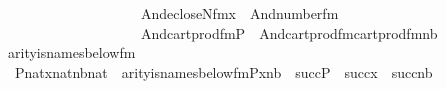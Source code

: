 \begin{isabellebody}
\ \ \ \ \ \ \ \ \ \ \ \ \ \ \ \ \ \ \ \ And{\isacharparenleft}{\kern0pt}ecloseN{\isacharunderscore}{\kern0pt}fm{\isacharparenleft}{\kern0pt}{}{\isacharcomma}{\kern0pt}x\ {\isacharhash}{\kern0pt}{\isacharplus}{\kern0pt}\ {}{\isacharparenright}{\kern0pt}{\isacharcomma}{\kern0pt}And{\isacharparenleft}{\kern0pt}number{}{\isacharunderscore}{\kern0pt}fm{\isacharparenleft}{\kern0pt}{}{\isacharparenright}{\kern0pt}{\isacharcomma}{\kern0pt}\isanewline
\ \ \ \ \ \ \ \ \ \ \ \ \ \ \ \ \ \ \ \ And{\isacharparenleft}{\kern0pt}cartprod{\isacharunderscore}{\kern0pt}fm{\isacharparenleft}{\kern0pt}{}{\isacharcomma}{\kern0pt}P\ {\isacharhash}{\kern0pt}{\isacharplus}{\kern0pt}\ {}{\isacharcomma}{\kern0pt}{}{\isacharparenright}{\kern0pt}{\isacharcomma}{\kern0pt}And{\isacharparenleft}{\kern0pt}cartprod{\isacharunderscore}{\kern0pt}fm{\isacharparenleft}{\kern0pt}{}{\isacharcomma}{\kern0pt}{}{\isacharcomma}{\kern0pt}{}{\isacharparenright}{\kern0pt}{\isacharcomma}{\kern0pt}cartprod{\isacharunderscore}{\kern0pt}fm{\isacharparenleft}{\kern0pt}{}{\isacharcomma}{\kern0pt}{}{\isacharcomma}{\kern0pt}nb{\isacharhash}{\kern0pt}{\isacharplus}{\kern0pt}{}{\isacharparenright}{\kern0pt}{\isacharparenright}{\kern0pt}{\isacharparenright}{\kern0pt}{\isacharparenright}{\kern0pt}{\isacharparenright}{\kern0pt}{\isacharparenright}{\kern0pt}{\isacharparenright}{\kern0pt}{\isacharparenright}{\kern0pt}{\isacharparenright}{\kern0pt}{\isachardoublequoteclose}\isanewline
\isanewline
{}\isamarkupfalse%
\ arity{\isacharunderscore}{\kern0pt}is{\isacharunderscore}{\kern0pt}names{\isacharunderscore}{\kern0pt}below{\isacharunderscore}{\kern0pt}fm\ {\isacharcolon}{\kern0pt}\isanewline
\ \ {\isachardoublequoteopen}{\isasymlbrakk}P{\isasymin}nat{\isacharsemicolon}{\kern0pt}x{\isasymin}nat{\isacharsemicolon}{\kern0pt}nb{\isasymin}nat{\isasymrbrakk}\ {\isasymLongrightarrow}\ arity{\isacharparenleft}{\kern0pt}is{\isacharunderscore}{\kern0pt}names{\isacharunderscore}{\kern0pt}below{\isacharunderscore}{\kern0pt}fm{\isacharparenleft}{\kern0pt}P{\isacharcomma}{\kern0pt}x{\isacharcomma}{\kern0pt}nb{\isacharparenright}{\kern0pt}{\isacharparenright}{\kern0pt}\ {\isacharequal}{\kern0pt}\ succ{\isacharparenleft}{\kern0pt}P{\isacharparenright}{\kern0pt}\ {\isasymunion}\ succ{\isacharparenleft}{\kern0pt}x{\isacharparenright}{\kern0pt}\ {\isasymunion}\ succ{\isacharparenleft}{\kern0pt}nb{\isacharparenright}{\kern0pt}{\isachardoublequoteclose}\isanewline
%
\isadelimproof

\end{isabellebody}
